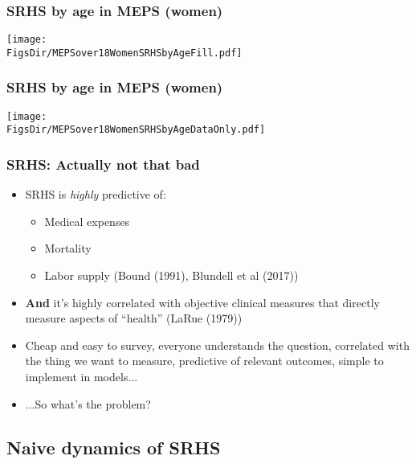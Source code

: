 \documentclass[aspectratio=169]{beamer}
\newcommand{\FigsDir}{../Figures}
\begin{document}
\begin{frame}\frametitle{SRHS by age in MEPS (women)}
\begin{center}
	\texttt{[image: \\FigsDir/MEPSover18WomenSRHSbyAgeFill.pdf]}
\end{center}
\end{frame}

\begin{frame}\frametitle{SRHS by age in MEPS (women)}
\begin{center}
	\texttt{[image: \\FigsDir/MEPSover18WomenSRHSbyAgeDataOnly.pdf]}
\end{center}
\end{frame}


\begin{frame}\frametitle{SRHS: Actually not that bad}
\begin{itemize}
	\item <1->SRHS is \textit{highly} predictive of:
	\begin{itemize}
		\item <1->Medical expenses
		
		\item <1->Mortality
		
		\item <1->Labor supply (Bound (1991), Blundell et al (2017))
	\end{itemize}

	\item <2->\textbf{And} it's highly correlated with objective clinical measures that directly measure aspects of ``health'' (LaRue (1979))
	
	\item <3->Cheap and easy to survey, everyone understands the question, correlated with the thing we want to measure, predictive of relevant outcomes, simple to implement in models...
	
	\item <3->...So what's the problem?
\end{itemize}
\end{frame}


\subsection{Naive dynamics of SRHS}
\end{document}
